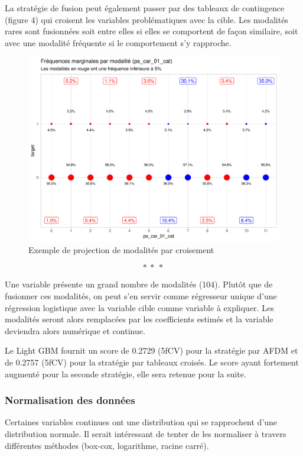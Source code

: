 \documentclass[french]{article}
\begin{document}
\begin{multicols}{2}
La stratégie de fusion peut également passer par des tableaux de contingence (figure 4) qui croisent les variables problématiques avec la cible. Les modalités rares sont fusionnées soit entre elles si elles se comportent de façon similaire, soit avec une modalité fréquente si le comportement s'y rapproche.

\begin{figure}[H] \centering
  \includegraphics[width = \columnwidth]{img/ex_tabc}
  \caption{Exemple de projection de modalités par croisement}
\end{figure}

\[ * \ * \ * \]

Une variable présente un grand nombre de modalités (104). Plutôt que de fusionner ces modalités, on peut s'en servir comme régresseur unique d'une régression logistique avec la variable cible comme variable à expliquer. Les modalités seront alors remplacées par les coefficients estimés et la variable deviendra alors numérique et continue.

Le Light GBM fournit un score de 0.2729 (5fCV) pour la stratégie par AFDM et de 0.2757 (5fCV) pour la stratégie par tableaux croisés. Le score ayant fortement augmenté pour la seconde stratégie, elle sera retenue pour la suite.

\subsubsection{Normalisation des données}

Certaines variables continues ont une distribution qui se rapprochent d'une distribution normale. Il serait intéressant de tenter de les normaliser à travers différentes méthodes (box-cox, logarithme, racine carré).


\end{multicols}
\end{document}
